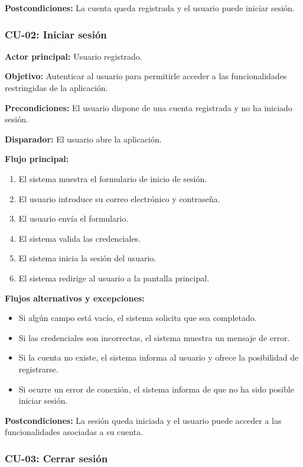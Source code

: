 \noindent \textbf{Postcondiciones:} La cuenta queda registrada y el usuario puede iniciar sesión.

\subsubsection{CU-02: Iniciar sesión}

\noindent \textbf{Actor principal:} Usuario registrado.

\noindent \textbf{Objetivo:} Autenticar al usuario para permitirle acceder a las funcionalidades restringidas de la aplicación.

\noindent \textbf{Precondiciones:} El usuario dispone de una cuenta registrada y no ha iniciado sesión.

\noindent \textbf{Disparador:} El usuario abre la aplicación.

\noindent \textbf{Flujo principal:}
\begin{enumerate}
    \item El sistema muestra el formulario de inicio de sesión.
    \item El usuario introduce su correo electrónico y contraseña.
    \item El usuario envía el formulario.
    \item El sistema valida las credenciales.
    \item El sistema inicia la sesión del usuario.
    \item El sistema redirige al usuario a la pantalla principal.
\end{enumerate}

\noindent \textbf{Flujos alternativos y excepciones:}
\begin{itemize}
    \item Si algún campo está vacío, el sistema solicita que sea completado.
    \item Si las credenciales son incorrectas, el sistema muestra un mensaje de error.
    \item Si la cuenta no existe, el sistema informa al usuario y ofrece la posibilidad de registrarse.
    \item Si ocurre un error de conexión, el sistema informa de que no ha sido posible iniciar sesión.
\end{itemize}

\noindent \textbf{Postcondiciones:} La sesión queda iniciada y el usuario puede acceder a las funcionalidades asociadas a su cuenta.

\subsubsection{CU-03: Cerrar sesión}

